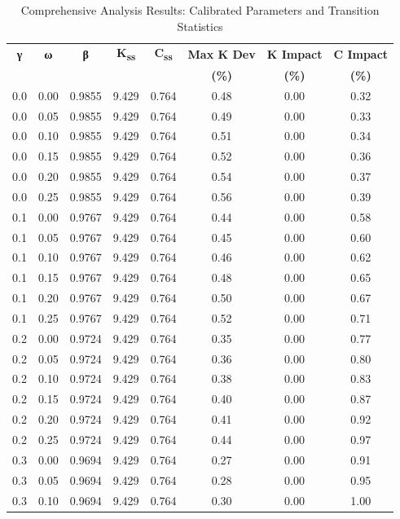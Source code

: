 \begin{table}[htbp]
\centering
\caption{Comprehensive Analysis Results: Calibrated Parameters and Transition Statistics}
\label{tab:comprehensive_results}
\begin{tabular}{cccccccc}
\hline
\textbf{γ} & \textbf{ω} & \textbf{β} & \textbf{K\textsubscript{ss}} & \textbf{C\textsubscript{ss}} & \textbf{Max K Dev} & \textbf{K Impact} & \textbf{C Impact} \\
 & & & & & \textbf{(\%)} & \textbf{(\%)} & \textbf{(\%)} \\
\hline
0.0 & 0.00 & 0.9855 & 9.429 & 0.764 & 0.48 & 0.00 & 0.32 \\
0.0 & 0.05 & 0.9855 & 9.429 & 0.764 & 0.49 & 0.00 & 0.33 \\
0.0 & 0.10 & 0.9855 & 9.429 & 0.764 & 0.51 & 0.00 & 0.34 \\
0.0 & 0.15 & 0.9855 & 9.429 & 0.764 & 0.52 & 0.00 & 0.36 \\
0.0 & 0.20 & 0.9855 & 9.429 & 0.764 & 0.54 & 0.00 & 0.37 \\
0.0 & 0.25 & 0.9855 & 9.429 & 0.764 & 0.56 & 0.00 & 0.39 \\
0.1 & 0.00 & 0.9767 & 9.429 & 0.764 & 0.44 & 0.00 & 0.58 \\
0.1 & 0.05 & 0.9767 & 9.429 & 0.764 & 0.45 & 0.00 & 0.60 \\
0.1 & 0.10 & 0.9767 & 9.429 & 0.764 & 0.46 & 0.00 & 0.62 \\
0.1 & 0.15 & 0.9767 & 9.429 & 0.764 & 0.48 & 0.00 & 0.65 \\
0.1 & 0.20 & 0.9767 & 9.429 & 0.764 & 0.50 & 0.00 & 0.67 \\
0.1 & 0.25 & 0.9767 & 9.429 & 0.764 & 0.52 & 0.00 & 0.71 \\
0.2 & 0.00 & 0.9724 & 9.429 & 0.764 & 0.35 & 0.00 & 0.77 \\
0.2 & 0.05 & 0.9724 & 9.429 & 0.764 & 0.36 & 0.00 & 0.80 \\
0.2 & 0.10 & 0.9724 & 9.429 & 0.764 & 0.38 & 0.00 & 0.83 \\
0.2 & 0.15 & 0.9724 & 9.429 & 0.764 & 0.40 & 0.00 & 0.87 \\
0.2 & 0.20 & 0.9724 & 9.429 & 0.764 & 0.41 & 0.00 & 0.92 \\
0.2 & 0.25 & 0.9724 & 9.429 & 0.764 & 0.44 & 0.00 & 0.97 \\
0.3 & 0.00 & 0.9694 & 9.429 & 0.764 & 0.27 & 0.00 & 0.91 \\
0.3 & 0.05 & 0.9694 & 9.429 & 0.764 & 0.28 & 0.00 & 0.95 \\
0.3 & 0.10 & 0.9694 & 9.429 & 0.764 & 0.30 & 0.00 & 1.00 \\

\end{tabular}
\end{table}
